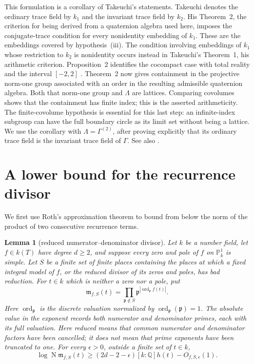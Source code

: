 \documentclass[11pt,reqno]{amsart}
\newtheorem{lemma}[theorem]{Lemma}
\theoremstyle{definition}
\theoremstyle{remark}
\newcommand{\Q}{\mathbb Q}
\newcommand{\Norm}{\operatorname{N}}
\begin{document}
This formulation is a corollary of Takeuchi's statements.  Takeuchi denotes
the ordinary trace field by \(k_1\) and the invariant trace field by
\(k_2\).  His Theorem~2, the criterion for being derived from a quaternion
algebra used here, imposes the conjugate-trace condition for every
nonidentity embedding of \(k_1\).  These are the embeddings covered by
hypothesis~(iii).  The condition involving embeddings of
\(k_1\) whose restriction to \(k_2\) is nonidentity occurs instead in
Takeuchi's Theorem~1, his arithmetic criterion.  Proposition~2 identifies
the cocompact case with total reality and the interval \([-2,2]\)
\cite[Theorem~2 and Proposition~2]{Takeuchi}.  Theorem~2 now gives
containment in the projective norm-one group associated with an order in
the resulting admissible quaternion algebra.  Both that norm-one group and
\(\Lambda\) are lattices.
Comparing covolumes shows that the containment has finite index; this is
the asserted arithmeticity.  The finite-covolume hypothesis is essential
for this last step: an infinite-index subgroup can have the full boundary
circle as its limit set without being a lattice.  We use the corollary with
\(\Lambda=\Gamma^{(2)}\), after proving explicitly that its ordinary trace
field is the invariant trace field of \(\Gamma\).  See also
\cite[Theorem~3.3.4 and Lemma~3.5.6]{MaclachlanReid}.

\section{A lower bound for the recurrence divisor}
\label{sec:roth-sieve}

We first use Roth's approximation theorem to bound from below the norm of
the product of two consecutive recurrence terms.

\begin{lemma}[reduced numerator--denominator divisor]
\label{lem:roth-reduced-divisor}
Let \(k\) be a number field, let \(f\in k(T)\) have degree \(d\ge2\), and
suppose every zero and pole of \(f\) on
\(\mathbb P^1_{\overline k}\) is simple.  Let \(S\) be a finite set of
finite places containing the places at which a fixed integral model of
\(f\), or the reduced divisor of its zeros and poles, has bad reduction.
For \(t\in k\) which is neither a zero nor a pole, put
\[
 \mathfrak m_{f,S}(t)=
 \prod_{\mathfrak p\notin S}
 \mathfrak p^{|\operatorname{ord}_{\mathfrak p}f(t)|}.
\]
Here \(\operatorname{ord}_{\mathfrak p}\) is the discrete valuation
normalized by \(\operatorname{ord}_{\mathfrak p}(\mathfrak p)=1\).  The
absolute value in the exponent records both numerator and denominator
primes, each with its full valuation.  Here \emph{reduced} means that common
numerator and denominator factors have been cancelled; it does not mean
that prime exponents have been truncated to one.
For every \(\epsilon>0\), outside a finite set of \(t\in k\),
\begin{equation}\label{eq:roth-reduced-divisor}
 \log\Norm\mathfrak m_{f,S}(t)
 \ge(2d-2-\epsilon)[k:\Q]h(t)-O_{f,S,\epsilon}(1).
\end{equation}
\end{lemma}
\end{document}
